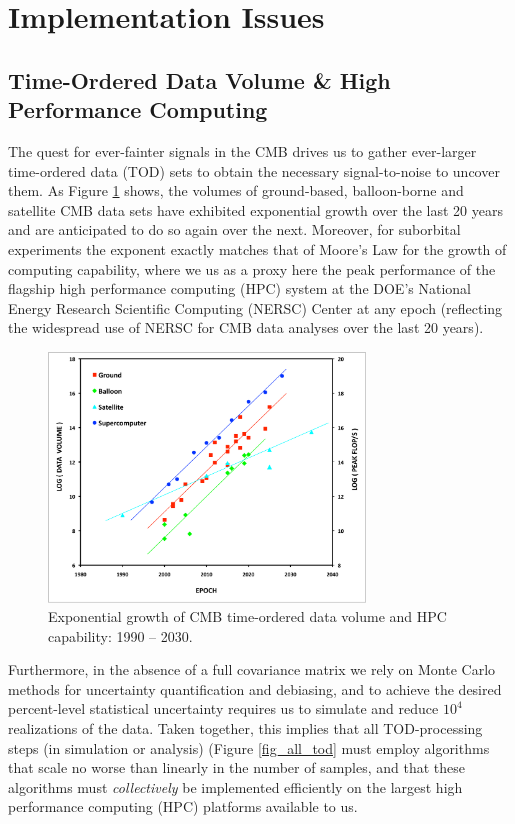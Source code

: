  
\section{Implementation Issues}

\subsection{Time-Ordered Data Volume \& High Performance Computing}

The quest for ever-fainter signals in the CMB drives us to gather ever-larger time-ordered data (TOD) sets to obtain the necessary signal-to-noise to uncover them. As Figure \ref{fig_cmb_hpc_scaling} shows, the volumes of ground-based, balloon-borne and satellite CMB data sets have exhibited exponential growth over the last 20 years and are anticipated to do so again over the next. Moreover, for suborbital experiments the exponent exactly matches that of Moore's Law for the growth of computing capability, where we us as a proxy here the peak performance of the flagship high performance computing (HPC) system at the DOE's National Energy Research Scientific Computing (NERSC) Center at any epoch (reflecting the widespread use of NERSC for CMB data analyses over the last 20 years). 

\begin{figure}[htbp]
\centering
\includegraphics[width=0.75\textwidth]{Analysis/cmb_hpc_scaling}
\caption{Exponential growth of CMB time-ordered data volume and HPC capability: 1990 -- 2030.}
\label{fig_cmb_hpc_scaling}
\end{figure}

Furthermore, in the absence of a full covariance matrix we rely on Monte Carlo methods for uncertainty quantification and debiasing, and to achieve the desired percent-level statistical uncertainty requires us to simulate and reduce $10^4$ realizations of the data. Taken together, this implies that all TOD-processing steps (in simulation or analysis) (Figure \ref{fig_all_tod} must employ algorithms that scale no worse than linearly in the number of samples, and that these algorithms must {\em collectively} be implemented efficiently on the largest high performance computing (HPC) platforms available to us. 

